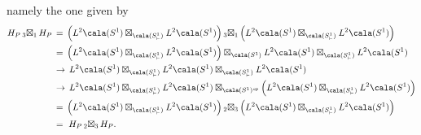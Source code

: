 \documentclass[a4paper,10pt,leqno]{amsart}
\theoremstyle{plain}
\theoremstyle{definition}
\theoremstyle{remark}
\newcommand{\op}{{\mathit{op}}}
\begin{document}
namely the one given by
\[
\begin{split}H_P\,\mbox{${}_3\boxtimes_1$}\, H_P\,&=\,\Big(L^2\cala(S^1)\boxtimes_{\cala(S^1_{\vdash})}L^2\cala(S^1)\Big)
\,\mbox{${}_3\boxtimes_1$}\, \Big(L^2\cala(S^1)\boxtimes_{\cala(S^1_{\vdash})}L^2\cala(S^1)\Big)\\
&=\,\Big(L^2\cala(S^1)\boxtimes_{\cala(S^1_{\vdash})}L^2\cala(S^1)\Big)\boxtimes_{\cala(S^1)}L^2\cala(S^1)\boxtimes_{\cala(S^1_{\vdash})}L^2\cala(S^1)\\
&\to\, L^2\cala(S^1)\boxtimes_{\cala(S^1_{\vdash})}L^2\cala(S^1)\boxtimes_{\cala(S^1_{\vdash})}L^2\cala(S^1)\\
&\to\, L^2\cala(S^1)\boxtimes_{\cala(S^1_{\vdash})}L^2\cala(S^1)\boxtimes_{\cala(S^1)^\op}\Big(L^2\cala(S^1)\boxtimes_{\cala(S^1_{\vdash})}L^2\cala(S^1)\Big)\\
&=\,\Big(L^2\cala(S^1)\boxtimes_{\cala(S^1_{\vdash})}L^2\cala(S^1)\Big)\,\mbox{${}_2\boxtimes_3$}\, \Big(L^2\cala(S^1)\boxtimes_{\cala(S^1_{\vdash})}L^2\cala(S^1)\Big)\\
&=\,\,H_P\,\mbox{${}_2\boxtimes_3$}\, H_P.
\end{split}
\]
\end{document}
